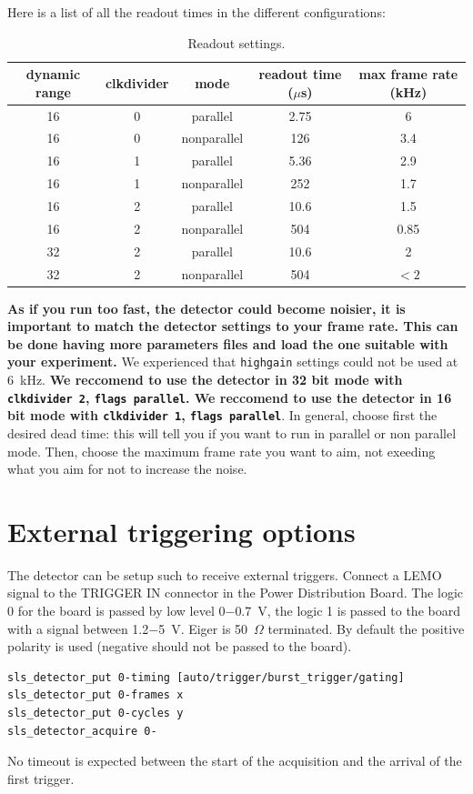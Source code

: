 \documentclass{article}
\begin{document}
Here is a list of all the readout times in the different configurations:
\begin{table}
\begin{tabular}{|c|c|c|c|c|}
\hline
dynamic range & clkdivider & mode & readout time ($\mu$s) & max frame rate (kHz)\\
\hline
16 & 0 & parallel & 2.75 & 6\\
\hline
16 & 0 & nonparallel &  126 & 3.4\\
\hline
16 & 1 & parallel &  5.36 & 2.9\\
\hline
16 & 1 & nonparallel & 252 & 1.7\\
\hline
16 & 2 & parallel &  10.6 & 1.5\\
\hline
16 & 2 & nonparallel & 504 & 0.85\\
\hline
32 & 2 & parallel &  10.6 & 2\\
\hline
32 & 2 & nonparallel & 504 & $<2$\\
\hline
\end{tabular}
\caption{Readout settings.}
\end{table}
\textbf{As if you run too fast, the detector could become noisier, it is important to match the detector settings to your frame rate. This can be done having more parameters files and load the one suitable with your experiment.} We experienced that {\tt{highgain}} settings could not be used at 6~kHz.
\textbf{We reccomend to use the detector in 32 bit mode with {\tt{clkdivider 2}}, {\tt{flags parallel}}. We reccomend to use the detector in 16 bit mode with {\tt{clkdivider 1}}, {\tt{flags parallel}}}. In general, choose first the desired dead time: this will tell you if you want to run in parallel or non parallel mode. Then, choose the maximum frame rate you want to aim, not exeeding what you aim for not to increase the noise.


\section{External triggering options}
The detector can be setup such to receive external triggers. Connect a LEMO signal to the TRIGGER IN connector in the Power Distribution Board. The logic 0 for the board is passed by low level 0$-$0.7~V, the logic 1 is passed to the board with a signal between 1.2$-$5~V. Eiger is 50~$\Omega$ terminated. By default the positive polarity is used (negative should not be passed to the board).  
\begin{verbatim}
sls_detector_put 0-timing [auto/trigger/burst_trigger/gating]
sls_detector_put 0-frames x
sls_detector_put 0-cycles y
sls_detector_acquire 0-
\end{verbatim}
No timeout is expected between the start of the acquisition and the arrival of the first trigger. 
\end{document}
